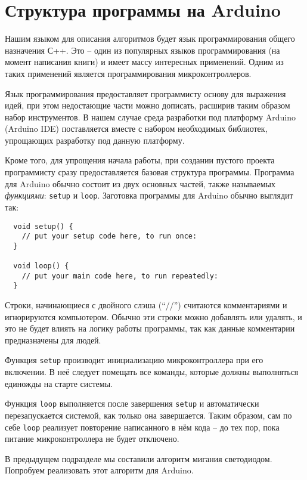 \documentclass[../sparc.tex]{subfiles}
\begin{document}
\section{Структура программы на Arduino}

Нашим языком для описания алгоритмов будет язык программирования общего
назначения С++.  Это -- один из популярных языков программирования (на момент
написания книги) и имеет массу интересных применений.  Одним из таких применений
является программирования микроконтроллеров.

Язык программирования предоставляет программисту основу для выражения идей, при
этом недостающие части можно дописать, расширив таким образом набор
инструментов.  В нашем случае среда разработки под платформу Arduino (Arduino
IDE) поставляется вместе с набором необходимых библиотек, упрощающих разработку
под данную платформу.

Кроме того, для упрощения начала работы, при создании пустого проекта
программисту сразу предоставляется базовая структура программы.  Программа для
Arduino обычно состоит из двух основных частей, также называемых
\emph{функциями}: \texttt{setup} и \texttt{loop}.  Заготовка программы для
Arduino обычно выглядит так:

\begin{verbatim}
  void setup() {
    // put your setup code here, to run once:
  }

  void loop() {
    // put your main code here, to run repeatedly:
  }
\end{verbatim}

Строки, начинающиеся с двойного слэша (``//'') считаются комментариями и
игнорируются компьютером.  Обычно эти строки можно добавлять или удалять, и это
не будет влиять на логику работы программы, так как данные комментарии
предназначены для людей.

Функция \texttt{setup} производит инициализацию микроконтроллера при его
включении.  В неё следует помещать все команды, которые должны выполняться
единожды на старте системы.

Функция \texttt{loop} выполняется после завершения \texttt{setup} и
автоматически перезапускается системой, как только она завершается.  Таким
образом, сам по себе \texttt{loop} реализует повторение написанного в нём кода --
до тех пор, пока питание микроконтроллера не будет отключено.

В предыдущем подразделе мы составили алгоритм мигания светодиодом.  Попробуем
реализовать этот алгоритм для Arduino.
\end{document}
